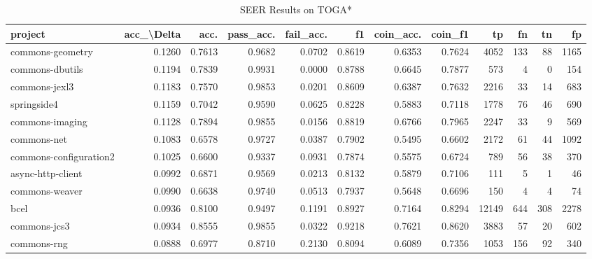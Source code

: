 \begin{table}
\centering
\caption{SEER Results on TOGA*}
\label{tab:toga_results_all}
\begin{tabular}{lrrrrrrrrrrr}
\toprule
                project &  acc\_\textbackslash Delta &    acc. &  pass\_acc. &  fail\_acc. &      f1 &  coin\_acc. &  coin\_f1 &      tp &    fn &    tn &     fp \\
\midrule
       commons-geometry &      0.1260 &  0.7613 &     0.9682 &     0.0702 &  0.8619 &     0.6353 &   0.7624 &    4052 &   133 &    88 &   1165 \\
        commons-dbutils &      0.1194 &  0.7839 &     0.9931 &     0.0000 &  0.8788 &     0.6645 &   0.7877 &     573 &     4 &     0 &    154 \\
          commons-jexl3 &      0.1183 &  0.7570 &     0.9853 &     0.0201 &  0.8609 &     0.6387 &   0.7632 &    2216 &    33 &    14 &    683 \\
            springside4 &      0.1159 &  0.7042 &     0.9590 &     0.0625 &  0.8228 &     0.5883 &   0.7118 &    1778 &    76 &    46 &    690 \\
        commons-imaging &      0.1128 &  0.7894 &     0.9855 &     0.0156 &  0.8819 &     0.6766 &   0.7965 &    2247 &    33 &     9 &    569 \\
            commons-net &      0.1083 &  0.6578 &     0.9727 &     0.0387 &  0.7902 &     0.5495 &   0.6602 &    2172 &    61 &    44 &   1092 \\
 commons-configuration2 &      0.1025 &  0.6600 &     0.9337 &     0.0931 &  0.7874 &     0.5575 &   0.6724 &     789 &    56 &    38 &    370 \\
      async-http-client &      0.0992 &  0.6871 &     0.9569 &     0.0213 &  0.8132 &     0.5879 &   0.7106 &     111 &     5 &     1 &     46 \\
         commons-weaver &      0.0990 &  0.6638 &     0.9740 &     0.0513 &  0.7937 &     0.5648 &   0.6696 &     150 &     4 &     4 &     74 \\
                   bcel &      0.0936 &  0.8100 &     0.9497 &     0.1191 &  0.8927 &     0.7164 &   0.8294 &   12149 &   644 &   308 &   2278 \\
           commons-jcs3 &      0.0934 &  0.8555 &     0.9855 &     0.0322 &  0.9218 &     0.7621 &   0.8620 &    3883 &    57 &    20 &    602 \\
            commons-rng &      0.0888 &  0.6977 &     0.8710 &     0.2130 &  0.8094 &     0.6089 &   0.7356 &    1053 &   156 &    92 &    340 \\

\end{tabular}
\end{table}
